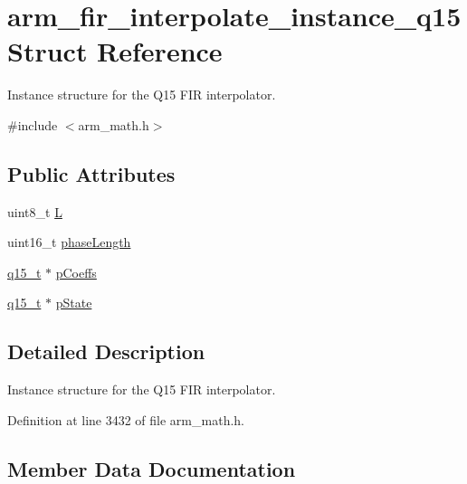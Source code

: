 \hypertarget{structarm__fir__interpolate__instance__q15}{}\section{arm\+\_\+fir\+\_\+interpolate\+\_\+instance\+\_\+q15 Struct Reference}
\label{structarm__fir__interpolate__instance__q15}


Instance structure for the Q15 F\+IR interpolator.  




{\ttfamily \#include $<$arm\+\_\+math.\+h$>$}

\subsection*{Public Attributes}
\begin{DoxyCompactItemize}
\item 
uint8\+\_\+t \hyperlink{structarm__fir__interpolate__instance__q15_a5431bdc079e72a973b51d359f7f13603}{L}
\item 
uint16\+\_\+t \hyperlink{structarm__fir__interpolate__instance__q15_ad5178a02a697a77e0d0e60705d9f0a19}{phase\+Length}
\item 
\hyperlink{arm__math_8h_ab5a8fb21a5b3b983d5f54f31614052ea}{q15\+\_\+t} $\ast$ \hyperlink{structarm__fir__interpolate__instance__q15_a767d91d61d4c0beeddd4325d28d28e24}{p\+Coeffs}
\item 
\hyperlink{arm__math_8h_ab5a8fb21a5b3b983d5f54f31614052ea}{q15\+\_\+t} $\ast$ \hyperlink{structarm__fir__interpolate__instance__q15_a26b864363fa47954248f2590e3a82a3c}{p\+State}
\end{DoxyCompactItemize}


\subsection{Detailed Description}
Instance structure for the Q15 F\+IR interpolator. 

Definition at line 3432 of file arm\+\_\+math.\+h.



\subsection{Member Data Documentation}
\mbox{\label{structarm__fir__interpolate__instance__q15_a5431bdc079e72a973b51d359f7f13603}} 
